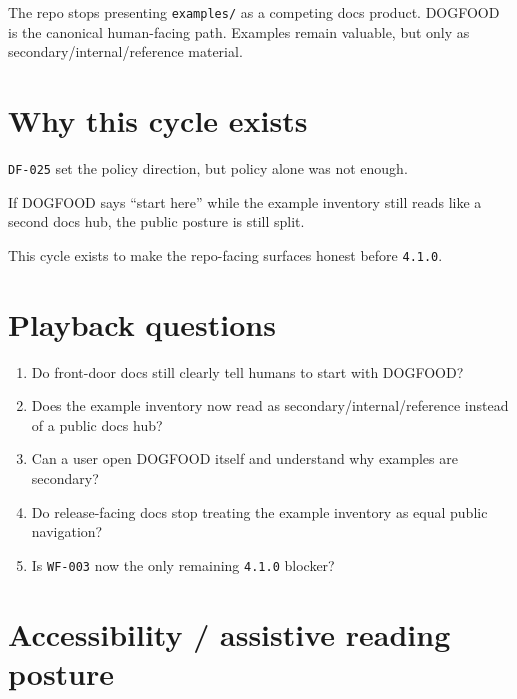 The repo stops presenting \texttt{e\allowbreak{}x\allowbreak{}a\allowbreak{}m\allowbreak{}p\allowbreak{}l\allowbreak{}e\allowbreak{}s\allowbreak{}/} as a competing docs product. DOGFOOD is the canonical human-facing path. Examples remain valuable, but only as secondary/internal/reference material.

\section{Why this cycle exists}\label{record-087-why-this-cycle-exists}

\texttt{D\allowbreak{}F\allowbreak{}-\allowbreak{}0\allowbreak{}2\allowbreak{}5} set the policy direction, but policy alone was not enough.

If DOGFOOD says ``start here'' while the example inventory still reads like a second docs hub, the public posture is still split.

This cycle exists to make the repo-facing surfaces honest before \texttt{4\allowbreak{}.\allowbreak{}1\allowbreak{}.\allowbreak{}0}.

\section{Playback questions}\label{record-087-playback-questions}

\begin{enumerate}
\def\labelenumi{\arabic{enumi}.}
\tightlist
\item
  Do front-door docs still clearly tell humans to start with DOGFOOD?
\item
  Does the example inventory now read as secondary/internal/reference instead of a public docs hub?
\item
  Can a user open DOGFOOD itself and understand why examples are secondary?
\item
  Do release-facing docs stop treating the example inventory as equal public navigation?
\item
  Is \texttt{W\allowbreak{}F\allowbreak{}-\allowbreak{}0\allowbreak{}0\allowbreak{}3} now the only remaining \texttt{4\allowbreak{}.\allowbreak{}1\allowbreak{}.\allowbreak{}0} blocker?
\end{enumerate}

\section{Accessibility / assistive reading posture}\label{record-087-accessibility-assistive-reading-posture}

